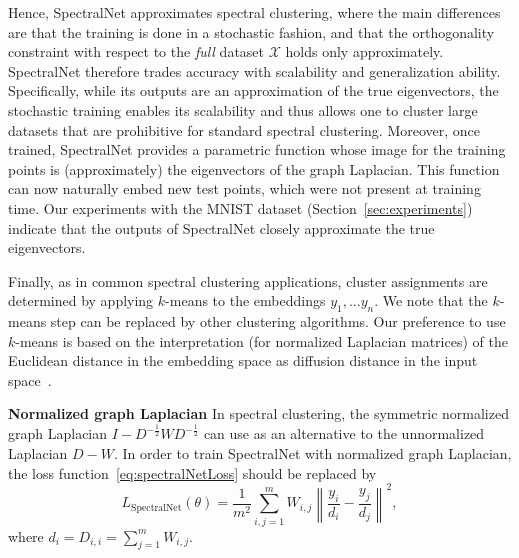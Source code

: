 \documentclass{article} %
\begin{document}
Hence, SpectralNet approximates spectral clustering, where the main differences are that the training is done in a stochastic fashion, and that the orthogonality constraint with respect to the \textit{full} dataset $\mathcal{X}$ holds only approximately.
SpectralNet therefore trades accuracy with scalability and generalization ability.
Specifically, while its outputs are an approximation of the true eigenvectors, the stochastic training enables its scalability and thus allows one to cluster large datasets that are prohibitive for standard spectral clustering.
Moreover, once trained, SpectralNet provides a parametric function whose image for the training points is (approximately) the eigenvectors of the graph Laplacian. This function can now naturally embed new test points, which were not present at training time.
Our experiments with the MNIST dataset (Section~\ref{sec:experiments}) indicate that the outputs of SpectralNet closely approximate the true eigenvectors.

Finally, as in common spectral clustering applications, cluster assignments are determined by applying $k$-means to the embeddings $y_1,\ldots y_n$. We note that the $k$-means step can be replaced by other clustering algorithms. Our preference to use $k$-means is based on the interpretation (for normalized Laplacian matrices) of the Euclidean distance in the embedding space as diffusion distance in the input space~\citep{nadler2006diffusion, coifman2006diffusion}.


\noindent \textbf{Normalized graph Laplacian} \quad
In spectral clustering, the symmetric normalized graph Laplacian $I-D^{-\frac{1}{2}}WD^{-\frac{1}{2}}$ can use as an alternative to the unnormalized Laplacian $D-W$. In order to train SpectralNet with normalized graph Laplacian, the loss function~\eqref{eq:spectralNetLoss} should be replaced by
\begin{equation}
L_\text{SpectralNet}(\theta) = \frac{1}{m^2}\sum_{i,j=1}^m W_{i,j}\left\|\frac{y_i}{d_i}-\frac{y_j}{d_j}\right\|^2,
\label{eq:spectralNetLoss_norm}
\end{equation}
where $d_i = D_{i,i} = \sum_{j=1}^m W_{i,j}$.


\end{document}
